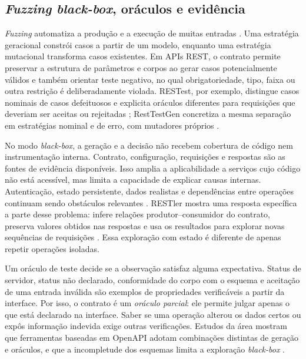 \subsection{\textit{Fuzzing black-box}, oráculos e evidência}

\textit{Fuzzing} automatiza a produção e a execução de muitas entradas
\cite{golmohammadi2023rest}. Uma estratégia
geracional constrói casos a partir de um modelo, enquanto uma estratégia
mutacional transforma casos existentes. Em APIs REST, o contrato permite
preservar a estrutura de parâmetros e corpos ao gerar casos potencialmente
válidos e também orientar teste negativo, no qual obrigatoriedade, tipo, faixa
ou outra restrição é deliberadamente violada. RESTest, por exemplo, distingue
casos nominais de casos defeituosos e explicita oráculos diferentes para
requisições que deveriam ser aceitas ou rejeitadas
\cite{martinlopez2020restest}; RestTestGen concretiza a mesma separação em
estratégias nominal e de erro, com mutadores próprios
\cite{corradini2022resttestgen}.

No modo \textit{black-box}, a geração e a decisão não recebem cobertura de código nem
instrumentação interna. Contrato, configuração, requisições e respostas são as
fontes de evidência disponíveis. Isso amplia a aplicabilidade a serviços cujo
código não está acessível, mas limita a capacidade de explicar causas internas.
Autenticação, estado persistente, dados realistas e dependências entre operações
continuam sendo obstáculos relevantes \cite{golmohammadi2023rest}. RESTler
mostra uma resposta específica a parte desse problema: infere relações
produtor--consumidor do contrato, preserva valores obtidos nas respostas e
usa os resultados para explorar novas sequências de requisições
\cite{atlidakis2019restler}. Essa exploração com estado é diferente de apenas
repetir operações isoladas.

Um oráculo de teste decide se a observação satisfaz alguma expectativa. Status
de servidor, status não declarado, conformidade do corpo com o esquema e
aceitação de uma entrada inválida são exemplos de propriedades verificáveis a
partir da interface. Por isso, o contrato é um \emph{oráculo parcial}: ele permite julgar apenas
o que está declarado na interface. Saber se uma operação alterou os dados
certos ou expôs informação indevida exige outras verificações. Estudos da
área mostram que ferramentas baseadas em OpenAPI adotam combinações distintas
de geração e oráculos, e que a incompletude dos esquemas limita a exploração
\textit{black-box} \cite{golmohammadi2023rest,zhang2023openproblems}.

